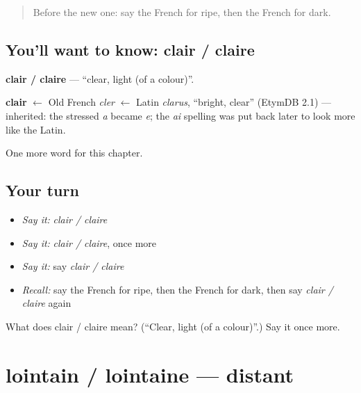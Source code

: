 \label{lesson:FR-C192-clair-claire}



\begin{quote}
Before the new one: say the French for ripe, then the French for dark.
\end{quote}

\subsection*{You'll want to know: clair / claire}
\textbf{clair / claire} — \textquotedblleft{}clear, light (of a colour)\textquotedblright{}.

\begin{cousinweb}
\textbf{clair} $\leftarrow$ Old French \emph{cler} $\leftarrow$ Latin \emph{clarus}, \textquotedblleft{}bright, clear\textquotedblright{} (EtymDB 2.1) — inherited: the stressed \emph{a} became \emph{e}; the \emph{ai} spelling was put back later to look more like the Latin.
\end{cousinweb}

\begin{grammarlens}[title={What you've built}]
One more word for this chapter.
\end{grammarlens}

\subsection*{Your turn}
\begin{itemize}
\raggedright
  \item \emph{Say it:} \emph{clair / claire}
  \item \emph{Say it:} \emph{clair / claire}, once more
  \item \emph{Say it:} say \emph{clair / claire}
  \item \emph{Recall:} say the French for ripe, then the French for dark, then say \emph{clair / claire} again
\end{itemize}

\begin{tcolorbox}[breakable,colback=teal!4,colframe=teal!35!black,title={Before you move on}]
What does clair / claire mean? (\textquotedblleft{}Clear, light (of a colour)\textquotedblright{}.) Say it once more.
\end{tcolorbox}
\section[lointain / lointaine]{lointain / lointaine — distant}

